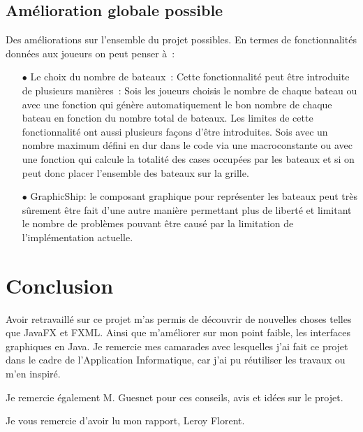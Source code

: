\documentclass[12pt]{article}
\begin{document}
\subsection{Amélioration globale possible}
Des améliorations sur l'ensemble du projet possibles. En termes de
fonctionnalités données aux joueurs on peut penser à :
\begin{itemize}
      \item[$\bullet$] Le choix du nombre de bateaux : Cette fonctionnalité
            peut être introduite de plusieurs manières : Sois les joueurs
            choisis le nombre
            de chaque bateau ou avec une fonction qui génère automatiquement le
            bon nombre
            de chaque bateau en fonction du nombre total de bateaux. Les
            limites de cette
            fonctionnalité ont aussi plusieurs façons d'être introduites. Sois
            avec un
            nombre maximum défini en dur dans le code via une macroconstante ou
            avec une
            fonction qui calcule la totalité des cases occupées par les bateaux
            et si on
            peut donc placer l'ensemble des bateaux sur la grille.
            \bigskip
      \item[$\bullet$] GraphicShip: le composant graphique pour représenter les
            bateaux peut très sûrement être fait d'une autre manière permettant
            plus de
            liberté et limitant le nombre de problèmes pouvant être causé par
            la limitation
            de l'implémentation actuelle.
            \bigskip
\end{itemize}

\section{Conclusion}

Avoir retravaillé sur ce projet m'as permis de découvrir de nouvelles choses
telles que JavaFX et FXML\@. Ainsi que m'améliorer sur mon point faible, les
interfaces graphiques en Java. Je remercie mes camarades avec lesquelles j'ai
fait ce projet dans le cadre de l'Application Informatique, car j'ai pu
réutiliser les travaux ou m'en inspiré.

Je remercie également M. Guesnet pour ces conseils, avis et idées sur le
projet.

Je vous remercie d'avoir lu mon rapport, Leroy Florent.
\end{document}
